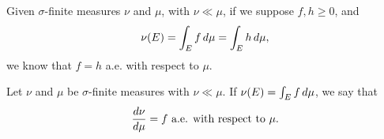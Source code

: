 \documentclass[notoc,notitlepage]{tufte-book}
\begin{document}
\begin{remark}
  Given $\sigma$-finite measures $\nu$ and $\mu$, with $\nu \ll \mu$,
  if we suppose $f, h \geq 0$, and
  \begin{equation*}
    \nu(E) = \int_{E} f \mathop{}\!d{\mu} = \int_{E} h \mathop{}\!d{\mu},
  \end{equation*}
  we know that $f = h$ a.e. with respect to $\mu$.
\end{remark}

\begin{defn}[Derivative]\label{defn:derivative}
  Let $\nu$ and $\mu$ be $\sigma$-finite measures with $\nu \ll \mu$.
  If $\nu(E) = \int_{E} f \mathop{}\!d{\mu}$, we say that
  \begin{equation*}
    \frac{\mathop{}\!d{\nu}}{\mathop{}\!d{\mu}} = f \text{ a.e. with respect to } \mu.
  \end{equation*}
\end{defn}
\end{document}
